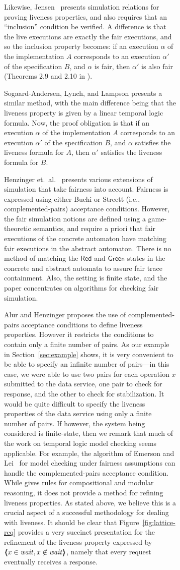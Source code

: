 \documentclass[11pt]{article}
\newcommand{\GREEN}{\mathsf{Green}}
\newcommand{\RED}{\mathsf{Red}}
\newcommand{\pair}[2]{\lpb #1, #2 \rpb}
\newcommand{\lpb}{\langle \hspace{-0.34em} \langle \hspace{-0.34em} \langle}
\newcommand{\rpb}{\rangle \hspace{-0.34em} \rangle \hspace{-0.34em} \rangle}
\newcommand{\ms}[1]{\relax\ifmmode
                \mathord{\mathcode`\-="702D\it #1\mathcode`\-="2200}\else
{\it #1}\fi
}
\newcommand{\statevar}[1]{\ms{#1}}
\newcommand{\wait}{\statevar{wait}}
\begin{document}
\begin{figure}[htb]
\begin{figure}[htb]
Likewise, Jensen~\cite{Jen99} presents simulation relations for 
proving liveness properties, and also requires that an ``inclusion''
condition be verified. A difference is that the live executions are
exactly the fair executions, and so the inclusion property becomes:
if an execution $\alpha$ of the implementation $A$
corresponds to an execution $\alpha'$ of the specification $B$,
and $\alpha$ is fair, then $\alpha'$ is also fair 
(Theorems 2.9 and 2.10 in \cite{Jen99}).

Sogaard-Andersen, Lynch, and Lampson \cite{SLL93} presents a similar
method, with the main difference being that the liveness property is
given by a linear temporal logic formula. Now, the proof obligation is
that if an execution $\alpha$ of the implementation $A$ corresponds to
an execution $\alpha'$ of the specification $B$, and $\alpha$
satisfies the liveness formula for $A$, then $\alpha'$ satisfies the
liveness formula for $B$.




Henzinger et.~al.~\cite{HKR97} presents various extensions of
simulation that take fairness into account.  Fairness is expressed
using either Buchi or Streett (i.e., complemented-pairs) acceptance
conditions. However, the fair simulation notions are defined using a
game-theoretic semantics, and require a priori that fair executions of
the concrete automaton have matching fair executions in the abstract
automaton. There is no method of matching the $\RED$ and $\GREEN$
states in the concrete and abstract automata to assure fair trace
containment. Also, the setting is finite state, and the paper
concentrates on algorithms for checking fair simulation.


Alur and Henzinger \cite{AH95} proposes the use of complemented-pairs acceptance
conditions to define liveness properties. However it restricts the
conditions to contain only a finite number of pairs. As our example in
Section~\ref{sec:example} shows, it is very convenient to be able to
specify an infinite number of pairs---in this case, we were able to
use two pairs for each operation $x$ submitted to the data service,
one pair to check for response, and the other to check for
stabilization. It would be quite difficult to specify the liveness
properties of the data service using only a finite number of pairs.
If however, the system being considered is finite-state, then we
remark that much of the work on temporal logic model
checking seems applicable. For example, the algorithm
of Emerson and Lei~\cite{EL85} for model checking under fairness assumptions can
handle the complemented-pairs acceptance condition.
While \cite{AH95} gives rules for compositional and modular
reasoning, it does not provide a method for refining liveness
properties. As stated above, we believe this is a crucial aspect of a
successful methodology for dealing with liveness. It should be clear
that Figure~\ref{fig:lattice-req} provides a very succinct
presentation for the refinement of the liveness property expressed by
$\pair{x \in \wait}{x \not\in \wait}$, namely that every request
eventually receives a response.


\end{figure}
\end{figure}
\end{document}
